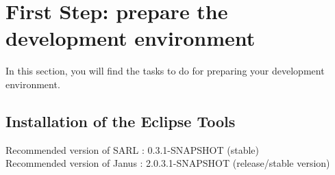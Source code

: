 \section{First Step: prepare the development environment}

In this section, you will find the tasks to do for preparing your development environment.

\subsection{Installation of the Eclipse Tools}

\begin{emphbox}
Recommended version of SARL : 0.3.1-SNAPSHOT (stable) \\
Recommended version of Janus : 2.0.3.1-SNAPSHOT (release/stable version)
\end{emphbox}

